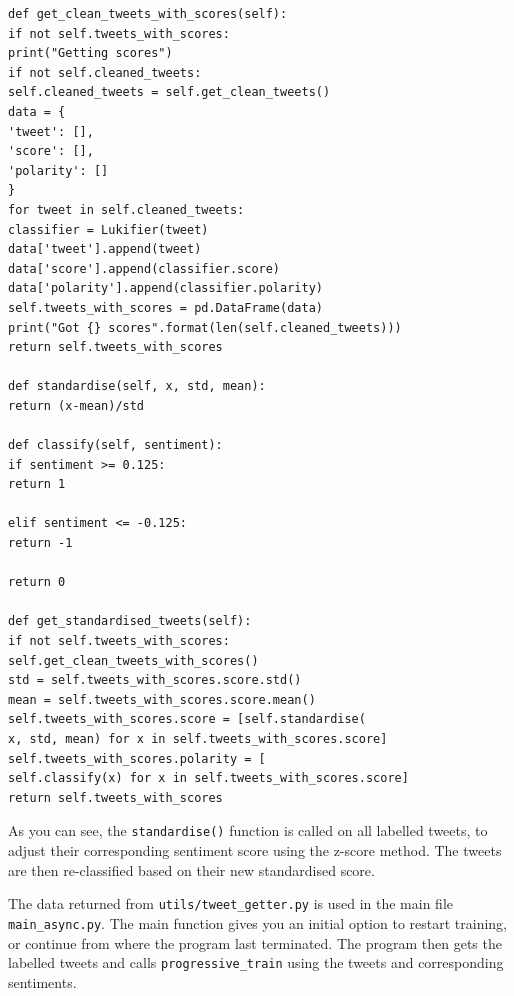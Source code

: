 \documentclass{article}
\begin{document}
\begin{lstlisting}
def get_clean_tweets_with_scores(self):
if not self.tweets_with_scores:
print("Getting scores")
if not self.cleaned_tweets:
self.cleaned_tweets = self.get_clean_tweets()
data = {
'tweet': [],
'score': [],
'polarity': []
}
for tweet in self.cleaned_tweets:
classifier = Lukifier(tweet)
data['tweet'].append(tweet)
data['score'].append(classifier.score)
data['polarity'].append(classifier.polarity)
self.tweets_with_scores = pd.DataFrame(data)
print("Got {} scores".format(len(self.cleaned_tweets)))
return self.tweets_with_scores

def standardise(self, x, std, mean):
return (x-mean)/std

def classify(self, sentiment):
if sentiment >= 0.125:
return 1

elif sentiment <= -0.125:
return -1

return 0

def get_standardised_tweets(self):
if not self.tweets_with_scores:
self.get_clean_tweets_with_scores()
std = self.tweets_with_scores.score.std()
mean = self.tweets_with_scores.score.mean()
self.tweets_with_scores.score = [self.standardise(
x, std, mean) for x in self.tweets_with_scores.score]
self.tweets_with_scores.polarity = [
self.classify(x) for x in self.tweets_with_scores.score]
return self.tweets_with_scores
\end{lstlisting}

As you can see, the \lstinline{standardise()} function is called on all labelled tweets, to adjust their corresponding sentiment score using the z-score method.
The tweets are then re-classified based on their new standardised score.

The data returned from \lstinline{utils/tweet_getter.py} is used in the main file \lstinline{main_async.py}.
The main function gives you an initial option to restart training, or continue from where the program last terminated.
The program then gets the labelled tweets and calls \lstinline{progressive_train} using the tweets and corresponding sentiments.
\end{document}
